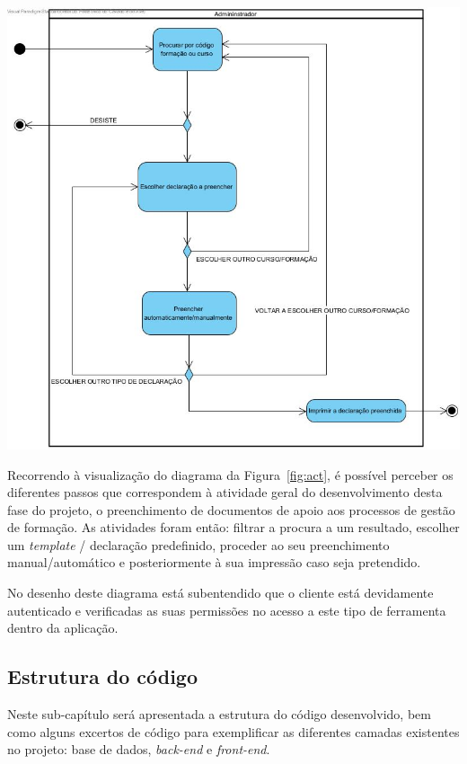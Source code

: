 \begin{center}
        \includegraphics[width=\textwidth,height=\textheight,keepaspectratio]{images/ActivityDiagram1.jpg}
        \label{fig:act}
\end{center}

Recorrendo à visualização do diagrama da Figura~\ref{fig:act}, é possível perceber os diferentes passos que correspondem à atividade geral do desenvolvimento desta fase do projeto, o preenchimento de documentos de apoio aos processos de gestão de formação. As atividades foram então: filtrar a procura a um resultado, escolher um \textit{template} / declaração predefinido, proceder ao seu preenchimento manual/automático e posteriormente à sua impressão caso seja pretendido.

No desenho deste diagrama está subentendido que o cliente está devidamente autenticado e verificadas as suas permissões no acesso a este tipo de ferramenta dentro da aplicação.

\subsection{Estrutura do código}
Neste sub-capítulo será apresentada a estrutura do código desenvolvido, bem como alguns excertos de código para exemplificar as diferentes camadas existentes no projeto: base de dados, \textit{back-end} e \textit{front-end}.

